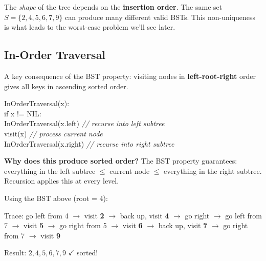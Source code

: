 \documentclass[11pt]{article}
\begin{document}
\begin{warnbox}
The \textit{shape} of the tree depends on the \textbf{insertion order}. The same set $S = \{2,4,5,6,7,9\}$ can produce many different valid BSTs. This non-uniqueness is what leads to the worst-case problem we'll see later.
\end{warnbox}

\subsection{In-Order Traversal}

A key consequence of the BST property: visiting nodes in \textbf{left-root-right} order gives all keys in \textcolor{greenO}{ascending sorted order}.

\begin{codebox}[InOrderTraversal(x)]
\ttfamily InOrderTraversal(x):\\
\ttfamily \hspace*{2em}if x != NIL:\\
\ttfamily \hspace*{4em}InOrderTraversal(x.left) \hfill\textnormal{\itshape // recurse into left subtree}\\
\ttfamily \hspace*{4em}visit(x) \hfill\textnormal{\itshape // process current node}\\
\ttfamily \hspace*{4em}InOrderTraversal(x.right) \hfill\textnormal{\itshape // recurse into right subtree}
\end{codebox}

\textbf{Why does this produce sorted order?} The BST property guarantees: everything in the left subtree $\leq$ current node $\leq$ everything in the right subtree. Recursion applies this at every level.

\begin{examplebox}
Using the BST above (root = 4):

\begin{center}
\end{center}

Trace: go left from 4 $\to$ visit \textbf{2} $\to$ back up, visit \textbf{4} $\to$ go right $\to$ go left from 7 $\to$ visit \textbf{5} $\to$ go right from 5 $\to$ visit \textbf{6} $\to$ back up, visit \textbf{7} $\to$ go right from 7 $\to$ visit \textbf{9}

Result: $2, 4, 5, 6, 7, 9$ \textcolor{greenO}{$\checkmark$ sorted!}
\end{examplebox}
\end{document}
